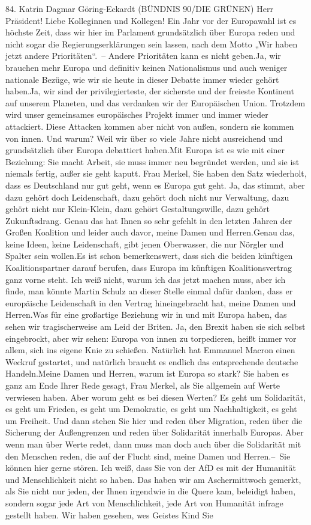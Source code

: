 \documentclass{article}
\begin{document}
	84. Katrin Dagmar Göring-Eckardt (BÜNDNIS 90/DIE GRÜNEN) Herr Präsident! Liebe Kolleginnen und Kollegen! Ein Jahr vor der Europawahl ist es höchste Zeit, dass wir hier im Parlament grundsätzlich über Europa reden und nicht sogar die Regierungserklärungen sein lassen, nach dem Motto „Wir haben jetzt andere Prioritäten“. – Andere Prioritäten kann es nicht geben.Ja, wir brauchen mehr Europa und definitiv keinen Nationalismus und auch weniger nationale Bezüge, wie wir sie heute in dieser Debatte immer wieder gehört haben.Ja, wir sind der privilegierteste, der sicherste und der freieste Kontinent auf unserem Planeten, und das verdanken wir der Europäischen Union. Trotzdem wird unser gemeinsames europäisches Projekt immer und immer wieder attackiert. Diese Attacken kommen aber nicht von außen, sondern sie kommen von innen. Und warum? Weil wir über so viele Jahre nicht ausreichend und grundsätzlich über Europa debattiert haben.Mit Europa ist es wie mit einer Beziehung: Sie macht Arbeit, sie muss immer neu begründet werden, und sie ist niemals fertig, außer sie geht kaputt. Frau Merkel, Sie haben den Satz wiederholt, dass es Deutschland nur gut geht, wenn es Europa gut geht. Ja, das stimmt, aber dazu gehört doch Leidenschaft, dazu gehört doch nicht nur Verwaltung, dazu gehört nicht nur Klein-Klein, dazu gehört Gestaltungswille, dazu gehört Zukunftsdrang. Genau das hat Ihnen so sehr gefehlt in den letzten Jahren der Großen Koalition und leider auch davor, meine Damen und Herren.Genau das, keine Ideen, keine Leidenschaft, gibt jenen Oberwasser, die nur Nörgler und Spalter sein wollen.Es ist schon bemerkenswert, dass sich die beiden künftigen Koalitionspartner darauf berufen, dass Europa im künftigen Koalitionsvertrag ganz vorne steht. Ich weiß nicht, warum ich das jetzt machen muss, aber ich finde, man könnte Martin Schulz an dieser Stelle einmal dafür danken, dass er europäische Leidenschaft in den Vertrag hineingebracht hat, meine Damen und Herren.Was für eine großartige Beziehung wir in und mit Europa haben, das sehen wir tragischerweise am Leid der Briten. Ja, den Brexit haben sie sich selbst eingebrockt, aber wir sehen: Europa von innen zu torpedieren, heißt immer vor allem, sich ins eigene Knie zu schießen. Natürlich hat Emmanuel Macron einen Weckruf gestartet, und natürlich braucht es endlich das entsprechende deutsche Handeln.Meine Damen und Herren, warum ist Europa so stark? Sie haben es ganz am Ende Ihrer Rede gesagt, Frau Merkel, als Sie allgemein auf Werte verwiesen haben. Aber worum geht es bei diesen Werten? Es geht um Solidarität, es geht um Frieden, es geht um Demokratie, es geht um Nachhaltigkeit, es geht um Freiheit. Und dann stehen Sie hier und reden über Migration, reden über die Sicherung der Außengrenzen und reden über Solidarität innerhalb Europas. Aber wenn man über Werte redet, dann muss man doch auch über die Solidarität mit den Menschen reden, die auf der Flucht sind, meine Damen und Herren.– Sie können hier gerne stören. Ich weiß, dass Sie von der AfD es mit der Humanität und Menschlichkeit nicht so haben. Das haben wir am Aschermittwoch gemerkt, als Sie nicht nur jeden, der Ihnen irgendwie in die Quere kam, beleidigt haben, sondern sogar jede Art von Menschlichkeit, jede Art von Humanität infrage gestellt haben. Wir haben gesehen, wes Geistes Kind Sie 
\end{document}
